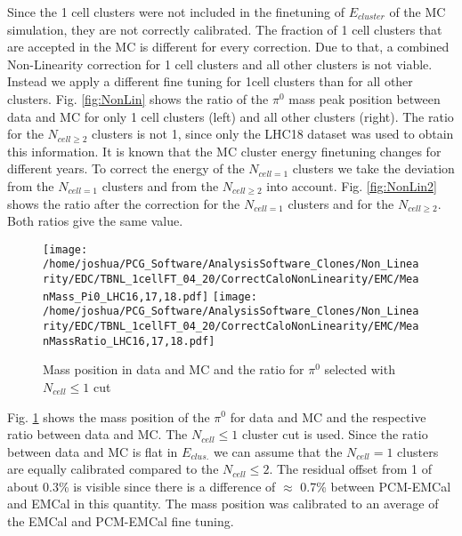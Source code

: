 \documentclass[ALICE]{ALICE_analysis_notes}
\newcommand{\PZ}{$\pi^0$\xspace}
\begin{document}
Since the 1 cell clusters were not included in the finetuning of $E_{cluster}$ of the MC simulation, they are not correctly calibrated. The fraction of 1 cell clusters that are accepted in the MC is different for every correction. Due to that, a combined Non-Linearity correction for 1 cell clusters and all other clusters is not viable. Instead we apply a different fine tuning for 1cell clusters than for all other clusters. Fig. \ref{fig:NonLin} shows the ratio of the $\pi^{0}$ mass peak position between data and MC for only 1 cell clusters (left) and all other clusters (right). The ratio for the $N_{cell \geq 2}$ clusters is not 1, since only the LHC18 dataset was used to obtain this information. It is known that the MC cluster energy finetuning changes for different years. To correct the energy of the $N_{cell = 1}$ clusters we take the deviation from the $N_{cell = 1}$ clusters and from the $N_{cell \geq 2}$ into account. Fig. \ref{fig:NonLin2} shows the ratio after the correction for the $N_{cell = 1}$ clusters and for the $N_{cell \geq 2}$. Both ratios give the same value. \\

\begin{figure}[h!]
	\centering
	\texttt{[image: /home/joshua/PCG\_Software/AnalysisSoftware\_Clones/Non\_Linearity/EDC/TBNL\_1cellFT\_04\_20/CorrectCaloNonLinearity/EMC/MeanMass\_Pi0\_LHC16,17,18.pdf]}
	\texttt{[image: /home/joshua/PCG\_Software/AnalysisSoftware\_Clones/Non\_Linearity/EDC/TBNL\_1cellFT\_04\_20/CorrectCaloNonLinearity/EMC/MeanMassRatio\_LHC16,17,18.pdf]}
	\caption{ Mass position in data and MC and the ratio for \PZ selected with $N_{cell} \leq 1$ cut}
	\label{fig:NonLin3}
\end{figure}

Fig. \ref{fig:NonLin3} shows the mass position of the \PZ for data and MC and the respective ratio between data and MC. The $N_{cell} \leq 1$ cluster cut is used. Since the ratio between data and MC is flat in $E_{clus.}$ we can assume that the $N_{cell} = 1$ clusters are equally calibrated compared to the $N_{cell} \leq 2$. The residual offset from 1 of about 0.3\% is visible since there is a difference of $\approx$ 0.7\% between PCM-EMCal and EMCal in this quantity. The mass position was calibrated to an average of the EMCal and PCM-EMCal fine tuning.
\end{document}
